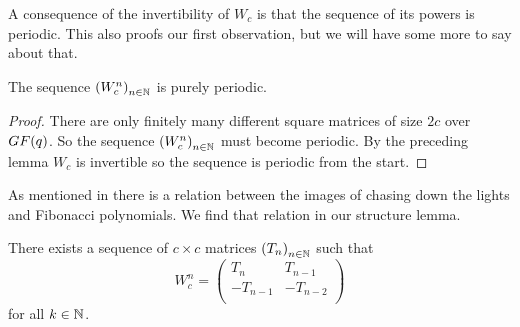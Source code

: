 A consequence of the invertibility of $W_{c}$ is that the sequence of its powers
is periodic. This also proofs our first observation, but we will have some more
to say about that.

\begin{theorem}
  The sequence $\left(W_{c}^{n}\right)_{n\in\mathbb{N}}$ is purely periodic.
\end{theorem}

\begin{proof}
  There are only finitely many different square matrices of size $2c$ over
  $GF(q)$. So the sequence $\left(W_{c}^{n}\right)_{n\in\mathbb{N}}$ must
  become periodic. By the preceding lemma $W_{c}$ is invertible so the
  sequence is periodic from the start.
\end{proof}

As mentioned in \cite{leach17} there is a relation between the images of chasing
down the lights and Fibonacci polynomials. We find that relation in our
structure lemma.

\begin{lemma}[structure]
  There exists a sequence of $c \times c$ matrices
  $\left(T_{n}\right)_{n\in\mathbb{N}}$ such that
  \[
  W_{c}^{n}
  =
  \left(
  \begin{array}{cc}
     T_{n} &  T_{n-1} \\
    -T_{n-1} & -T_{n-2}   \\
  \end{array}
  \right)
  \]
  for all $k\in\mathbb{N}$.
\end{lemma}

